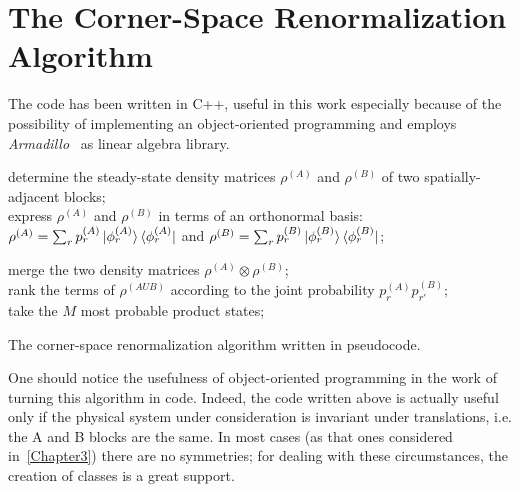 \chapter{The Corner-Space Renormalization Algorithm} %
\label{AppendixA}

The code has been written in C++, useful in this work especially because of the possibility of implementing an object-oriented programming and employs \emph{Armadillo}~\cite{arma:book, arma:art} as linear algebra library. 

\begin{algorithm}

\SetAlgoLined
{}
\bigskip
{}
{
\smallskip
determine the steady-state density matrices $\rho^{(A)}$ and $\rho^{(B)}$ of two spatially-adjacent blocks;\\
\smallskip
express $\rho^{(A)}$ and $\rho^{(B)}$ in terms of an orthonormal basis:
$\rho^{(A)} = \sum_r p_r^{(A)}\ket{\phi_r^{(A)}}\bra{\phi_r^{(A)}}$ and $\rho^{(B)} = \sum_r p_r^{(B)}\ket{\phi_r^{(B)}}\bra{\phi_r^{(B)}}$;
\smallskip

\smallskip

merge the two density matrices $\rho^{(A)} \otimes \rho^{(B)}$;\\
\smallskip
rank the terms of $\rho^{(AUB)}$ according to the joint probability $p_r^{(A)}p_{r'}^{(B)}$;\\
\smallskip
take the $M$ most probable product states;\\
\smallskip
{}
}

\caption{The corner-space renormalization algorithm written in pseudocode.}
\label{pseudocode}
\end{algorithm}

One should notice the usefulness of object-oriented programming in the work of turning this algorithm in code. Indeed, the code written above is actually useful only if the physical system under consideration is invariant under translations, i.e. the A and B blocks are the same. In most cases (as that ones considered in~\ref{Chapter3}) there are no symmetries; for dealing with these circumstances, the creation of classes is a great support.

